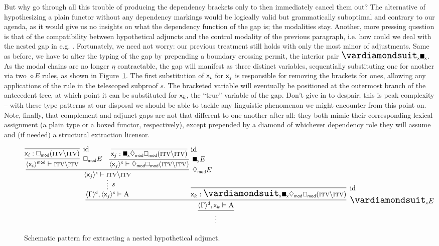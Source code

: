 But why go through all this trouble of producing the dependency brackets only to then immediately cancel them out?
The alternative of hypothesizing a plain functor without any dependency markings would be logically valid but grammatically suboptimal and contrary to our agenda, as it would give us no insights on what the dependency function of the gap is; the modalities stay.
Another, more pressing question is that of the compatibility between hypothetical adjuncts and the control modality of the previous paragraph, i.e. how could we deal with the nested gap in e.g. .
Fortunately, we need not worry: our previous treatment still holds with only the most minor of adjustments.
Same as before, we have to alter the typing of the gap by prepending a boundary crossing permit, the interior pair $\dxdia{x}\dxbox{x}$.
As the modal chains are no longer $\eta$ contractable, the gap will manifest as three distinct variables, sequentially substituting one for another via two $\diamond E$ rules, as shown in Figure~\ref{figure:higher_order_nested_dep}.
The first substitution of $\mathsf{x}_{\mathnormal{i}}$ for $\mathsf{x}_{\mathnormal{j}}$ is responsible for removing the  brackets for  ones, allowing any applications of the \Extraction{} rule in the telescoped subproof $s$.
The bracketed variable will eventually be positioned at the outermost branch of the antecedent tree, at which point it can be substituted for $\mathsf{x}_{\mathnormal{k}}$, the ``true'' variable of the gap.
Don't give in to despair; this is peak complexity -- with these type patterns at our disposal we should be able to tackle any linguistic phenomenon we might encounter from this point on.
Note, finally, that complement and adjunct gaps are not that different to one another after all: they both mimic their corresponding lexical assignment (a plain type or a boxed functor, respectively), except prepended by a diamond of whichever dependency role they will assume and (if needed) a structural extraction licensor.


\begin{figure}
	\smaller
	\[
		\infer{\vdots}{
			\infer[\dxdia{x} E]{\dbra{\Gamma}{d}, \vark \vdash \prop{A}}{
				\infer*[s]{\dbra{\Gamma}{d}, \dbra{\varj}{x} \vdash \prop{A}}{
					\infer[\ddia{mod} E]{\dbra{\varj}{x} \vdash \gtype{itv}\divleft\gtype{itv}}{
						\infer[\dbox{mod} E]{\dbra{\vari}{mod} \vdash \gtype{itv}\divleft\gtype{itv}}{
							\infer[\Ax]{\vari : \dbox{mod}(\gtype{itv}\divleft\gtype{itv})}{}
						}
						&
						\infer[\dxbox{x} E]{\dbra{\varj}{x} \vdash \ddia{mod}\dbox{mod}(\gtype{itv}\divleft\gtype{itv})}{
							\infer[\Ax]{\varj : \dxbox{x}\ddia{mod}\dbox{mod}(\gtype{itv}\divleft\gtype{itv})}{}
						}
					}
				}
				&
				\hspace{-40pt}
				\infer[\Ax]{\vark : \dxdia{x}\dxbox{x}\ddia{mod}\dbox{mod}(\gtype{itv}\divleft\gtype{itv})}{}
			}
		}
	\]
	\caption{Schematic pattern for extracting a nested hypothetical adjunct.}
	\label{figure:higher_order_nested_dep}
\end{figure}


